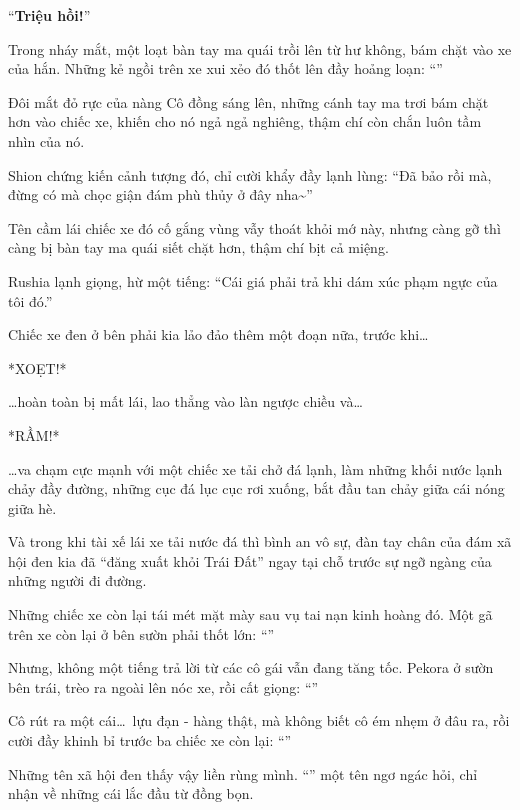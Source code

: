 \documentclass[../main.tex]{subfiles}
\begin{document}
``\textbf{Triệu hồi!}''

Trong nháy mắt, một loạt bàn tay ma quái trồi lên từ hư không, bám chặt vào xe của hắn. Những kẻ ngồi trên xe xui xẻo đó thốt lên đầy hoảng loạn: ``\textbf{}''

Đôi mắt đỏ rực của nàng Cô đồng sáng lên, những cánh tay ma trơi bám chặt hơn vào chiếc xe, khiến cho nó ngả ngả nghiêng, thậm chí còn chắn luôn tầm nhìn của nó.

Shion chứng kiến cảnh tượng đó, chỉ cười khẩy đầy lạnh lùng: ``Đã bảo rồi mà, đừng có mà chọc giận đám phù thủy ở đây nha\~{}''

Tên cầm lái chiếc xe đó cố gắng vùng vẫy thoát khỏi mớ này, nhưng càng gỡ thì càng bị bàn tay ma quái siết chặt hơn, thậm chí bịt cả miệng.

Rushia lạnh giọng, hừ một tiếng: ``Cái giá phải trả khi dám xúc phạm ngực của tôi đó.''

Chiếc xe đen ở bên phải kia lảo đảo thêm một đoạn nữa, trước khi\dots

*XOẸT!*

\dots hoàn toàn bị mất lái, lao thẳng vào làn ngược chiều và\dots

*RẦM!*

\dots va chạm cực mạnh với một chiếc xe tải chở đá lạnh, làm những khối nước lạnh chảy đầy đường, những cục đá lục cục rơi xuống, bắt đầu tan chảy giữa cái nóng giữa hè.

Và trong khi tài xế lái xe tải nước đá thì bình an vô sự, đàn tay chân của đám xã hội đen kia đã ``đăng xuất khỏi Trái Đất'' ngay tại chỗ trước sự ngỡ ngàng của những người đi đường.

Những chiếc xe còn lại tái mét mặt mày sau vụ tai nạn kinh hoàng đó. Một gã trên xe còn lại ở bên sườn phải thốt lớn: ``''

Nhưng, không một tiếng trả lời từ các cô gái vẫn đang tăng tốc. Pekora ở sườn bên trái, trèo ra ngoài lên nóc xe, rồi cất giọng: ``''

Cô rút ra một cái\dots\ lựu đạn - hàng thật, mà không biết cô ém nhẹm ở đâu ra, rồi cười đầy khinh bỉ trước ba chiếc xe còn lại: ``''

Những tên xã hội đen thấy vậy liền rùng mình. ``'' một tên ngơ ngác hỏi, chỉ nhận về những cái lắc đầu từ đồng bọn.
\end{document}
